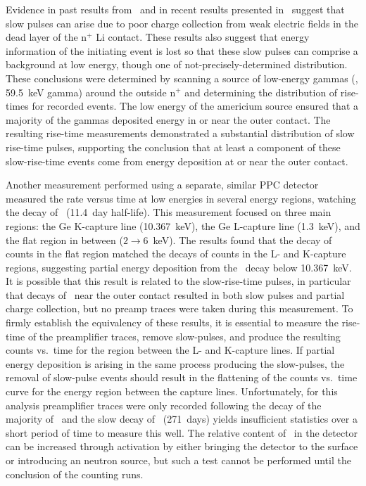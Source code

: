Evidence in past results from~\cite{Strauss196780,Sakai:1971ff} and in recent results presented in~\cite{Aalseth:2010aa} suggest that slow pulses can arise due to poor charge collection from weak electric fields in the dead layer of the n$^{+}$ Li contact.  These results also suggest that energy information of the initiating event is lost so that these slow pulses can comprise a background at low energy, though one of not-precisely-determined distribution.  These conclusions were determined by scanning a source of low-energy gammas (\amtwofourone, 59.5~keV gamma) around the outside n$^{+}$ and determining the distribution of rise-times for recorded events.  The low energy of the americium source ensured that a majority of the gammas deposited energy in or near the outer contact.  The resulting rise-time measurements demonstrated a substantial distribution of slow rise-time pulses, supporting the conclusion that at least a component of these slow-rise-time events come from energy deposition at or near the outer contact.  

Another measurement performed using a separate, similar PPC detector~\cite{Barbeau:2009fk} measured the rate versus time at low energies in several energy regions, watching the decay of \gersevenone~(11.4~day half-life).  This measurement focused on three main regions: the Ge K-capture line (10.367~keV), the Ge L-capture line (1.3~keV), and the flat region in between ($2\to6$~keV).  The results found that the decay of counts in the flat region matched the decays of counts in the L- and K-capture regions, suggesting partial energy deposition from the \gersevenone~decay below 10.367~keV.  It is possible that this result is related to the slow-rise-time pulses, in particular that decays of \gersevenone~near the outer contact resulted in both slow pulses and partial charge collection, but no preamp traces were taken during this measurement.  To firmly establish the equivalency of these results, it is essential to measure the rise-time of the preamplifier traces, remove slow-pulses, and produce the resulting counts vs.~time for the region between the L- and K-capture lines.  If partial energy deposition is arising in the same process producing the slow-pulses, the removal of slow-pulse events should result in the flattening of the counts vs.~time curve for the energy region between the capture lines.  Unfortunately, for this analysis preamplifier traces were only recorded following the decay of the majority of \gersevenone~and the slow decay of \gersixeight~(271~days) yields insufficient statistics over a short period of time to measure this well.  The relative content of \gersevenone~in the detector can be increased through activation by either bringing the detector to the surface or introducing an neutron source, but such a test cannot be performed until the conclusion of the counting runs.  

